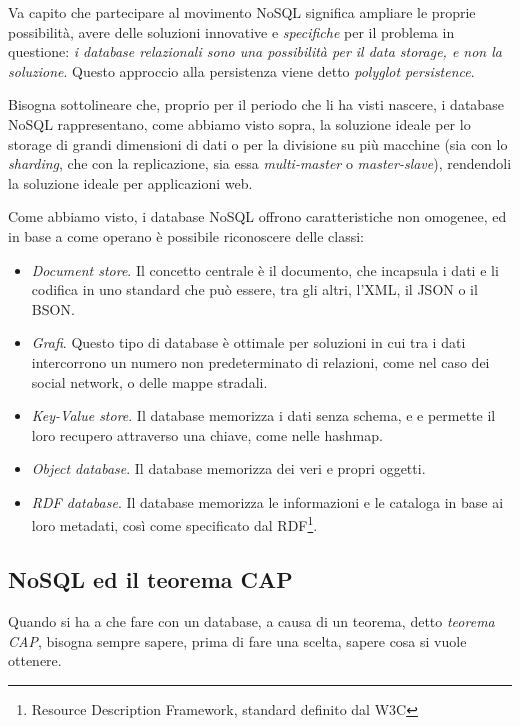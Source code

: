 Va capito che partecipare al movimento NoSQL significa ampliare le proprie possibilità, avere delle soluzioni innovative e \emph{specifiche} per il problema in questione: \emph{i database relazionali sono una possibilità per il data storage, e non la soluzione}. Questo approccio alla persistenza viene detto \emph{polyglot persistence}.

Bisogna sottolineare che, proprio per il periodo che li ha visti nascere, i database NoSQL rappresentano, come abbiamo visto sopra, la soluzione ideale per lo storage di grandi dimensioni di dati o per la divisione su più macchine (sia con lo \emph{sharding}, che con la replicazione, sia essa \emph{multi-master} o \emph{master-slave}), rendendoli la soluzione ideale per applicazioni web.

Come abbiamo visto, i database NoSQL offrono caratteristiche non omogenee, ed in base a come operano è possibile riconoscere delle classi:
\begin{itemize}
\item \emph{Document store}. Il concetto centrale è il documento, che incapsula i dati e li codifica in uno standard che può essere, tra gli altri, l'XML, il JSON o il BSON.
\item \emph{Grafi}. Questo tipo di database è ottimale per soluzioni in cui tra i dati intercorrono un numero non predeterminato di relazioni, come nel caso dei social network, o delle mappe stradali.
\item \emph{Key-Value store}. Il database memorizza i dati senza schema, e e permette il loro recupero attraverso una chiave, come nelle hashmap.
\item \emph{Object database}. Il database memorizza dei veri e propri oggetti.
\item \emph{RDF database}. Il database memorizza le informazioni e le cataloga in base ai loro metadati, così come specificato dal RDF\footnote{Resource Description Framework, standard definito dal W3C}.
\end{itemize}

\subsection{NoSQL ed il teorema CAP}
Quando si ha a che fare con un database, a causa di un teorema, detto \emph{teorema CAP}, bisogna sempre sapere, prima di fare una scelta, sapere cosa si vuole ottenere.

